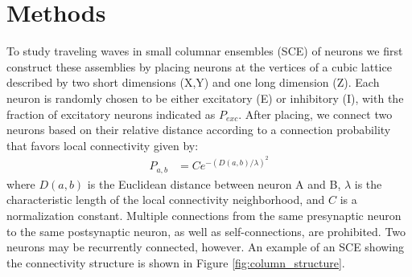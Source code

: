\documentclass[12pt]{article}
\begin{document}
\section{Methods}
To study traveling waves in small columnar ensembles (SCE) of neurons we first construct these assemblies by placing neurons at the vertices of a cubic lattice described by two short \color{red} dimensions (X,Y) and one long dimension (Z)\color{black}. 
Each neuron is \color{red} randomly chosen to be \color{black} either excitatory (E) or inhibitory (I), with the fraction of excitatory neurons indicated as $P_{exc}$.
After placing, we connect two neurons based on their relative distance according to a connection probability that favors local connectivity given by: 
\begin{align}\label{eq:connectivity}
 P_{a,b} &= C e^{-(D(a,b)/\lambda)^2}
\end{align}
where $D(a,b)$ is the Euclidean distance between neuron A and B, $\lambda$ is the characteristic length of the local connectivity neighborhood, and $C$ is a normalization constant.
\color{red}Multiple connections from the same presynaptic neuron to the same postsynaptic neuron, as well as self-connections, are prohibited.
Two neurons may be recurrently connected, however. \color{black}
An example of an SCE showing the connectivity structure is shown in Figure \ref{fig:column_structure}.
\end{document}
